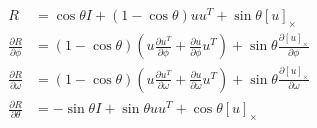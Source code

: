 \documentclass[12pt]{article}
\newcommand*{\Scale}[2][4]{\scalebox{#1}{$#2$}}%
\begin{document}
\begin{align}
  R &= \cos\theta I + (1-\cos\theta)uu^T + \sin\theta[u]_\times \\
  \frac{\partial R}{\partial\phi} &= (1-\cos\theta)(u\frac{\partial u^T}{\partial\phi} + \frac{\partial u}{\partial\phi}u^T) + \sin\theta\frac{\partial [u]_\times}{\partial\phi} \\ 
  \frac{\partial R}{\partial\omega} &= (1-\cos\theta)(u\frac{\partial u^T}{\partial\omega} + \frac{\partial u}{\partial\omega}u^T) + \sin\theta\frac{\partial [u]_\times}{\partial\omega}  \\
  \frac{\partial R}{\partial\theta} &= -\sin\theta I + \sin\theta uu^T + \cos\theta[u]_\times \\
\end{align}


\end{document}
